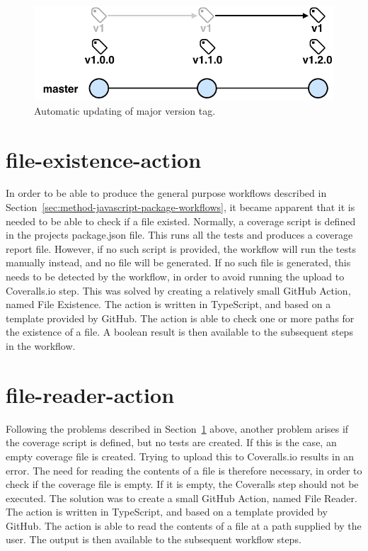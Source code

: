 \begin{figure}[hp]
    \setlength{\abovecaptionskip}{25pt}
    \centering
    \hspace*{-2cm}\includegraphics[page=1,scale=1]{sections/methodology/figures/update-major-tag.pdf}
    \caption{Automatic updating of major version tag.}
    \label{fig:update-major-tag}
\end{figure}

\section{file-existence-action}
\label{sec:method-file-existence-action}
In order to be able to produce the general purpose workflows described in Section~\ref{sec:method-javascript-package-workflows}, it became apparent that it is needed to be able to check if a file existed. Normally, a coverage script is defined in the projects package.json file. This runs all the tests and produces a coverage report file. However, if no such script is provided, the workflow will run the tests manually instead, and no file will be generated. If no such file is generated, this needs to be detected by the workflow, in order to avoid running the upload to Coveralls.io step. This was solved by creating a relatively small GitHub Action, named File Existence. The action is written in TypeScript, and based on a template provided by GitHub. The action is able to check one or more paths for the existence of a file. A boolean result is then available to the subsequent steps in the workflow.

\section{file-reader-action}
\label{sec:method-file-reader-action}
Following the problems described in Section~\ref{sec:method-file-existence-action} above, another problem arises if the coverage script is defined, but no tests are created. If this is the case, an empty coverage file is created. Trying to upload this to Coveralls.io results in an error. The need for reading the contents of a file is therefore necessary, in order to check if the coverage file is empty. If it is empty, the Coveralls step should not be executed. The solution was to create a small GitHub Action, named File Reader. The action is written in TypeScript, and based on a template provided by GitHub. The action is able to read the contents of a file at a path supplied by the user. The output is then available to the subsequent workflow steps.

